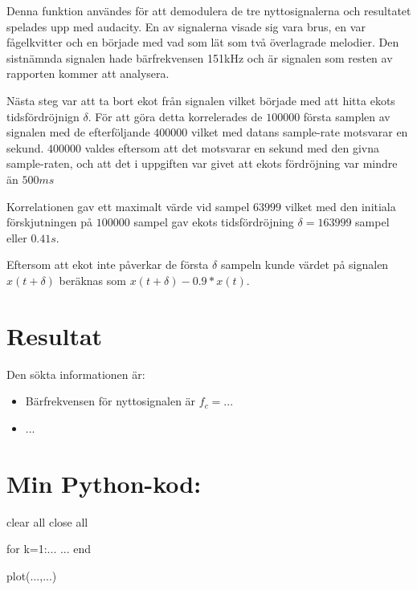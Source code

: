 \documentclass[10pt,twocolumn]{article}
\begin{document}
Denna funktion användes för att demodulera de tre nyttosignalerna och resultatet spelades
upp med audacity. En av signalerna visade sig vara brus, en var fågelkvitter och en började
med vad som lät som två överlagrade melodier. Den sistnämnda signalen hade bärfrekvensen 151kHz
och är signalen som resten av rapporten kommer att analysera.

Nästa steg var att ta bort ekot från signalen vilket började med att hitta ekots tidsfördröjnign $\delta$.
För att göra detta korrelerades de $100000$ första samplen
av signalen med de efterföljande $400000$ vilket med datans sample-rate motsvarar en sekund.
$400000$ valdes eftersom att det motsvarar en sekund med den givna sample-raten,
och att det i uppgiften var givet att ekots fördröjning var mindre än $500ms$

Korrelationen gav ett maximalt värde vid sampel $63999$ vilket med den initiala förskjutningen på
$100000$ sampel gav ekots tidsfördröjning $\delta=163999$ sampel eller $0.41s$.

Eftersom att ekot inte påverkar de första $\delta$ sampeln kunde värdet på signalen $x(t+\delta)$ beräknas
som $x(t+\delta) - 0.9*x(t)$.

\section{Resultat}

Den sökta informationen är:
\begin{itemize}
\item Bärfrekvensen för nyttosignalen är $f_c=...$
\item ...
\end{itemize}

\clearpage

\section*{Min Python-kod:}
\begin{spverbatim}
clear all
close all

for k=1:...
  ...
end

plot(...,...)
\end{spverbatim}
\end{document}
